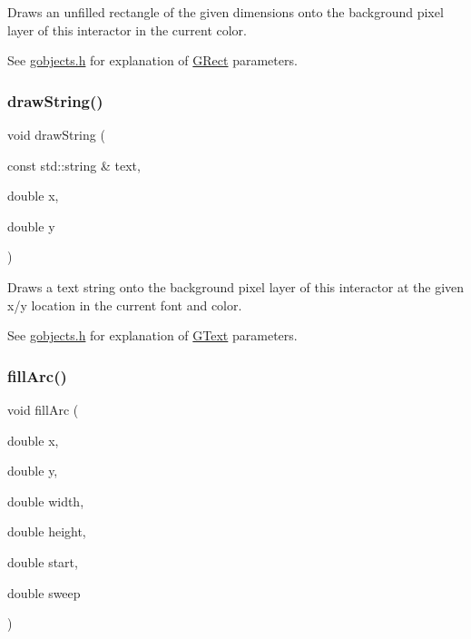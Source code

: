 Draws an unfilled rectangle of the given dimensions onto the background pixel layer of this interactor in the current color. 

See \mbox{\hyperlink{gobjects_8h_source}{gobjects.\+h}} for explanation of \mbox{\hyperlink{classGRect}{G\+Rect}} parameters. \mbox{\label{classGDrawingSurface_ad4e8551a753a77135792bbee97013675}} 
\subsubsection{\texorpdfstring{draw\+String()}{drawString()}}
{\footnotesize\ttfamily void draw\+String (\begin{DoxyParamCaption}\item[{const std\+::string \&}]{text,  }\item[{double}]{x,  }\item[{double}]{y }\end{DoxyParamCaption})\hspace{0.3cm}{\ttfamily [virtual]}}



Draws a text string onto the background pixel layer of this interactor at the given x/y location in the current font and color. 

See \mbox{\hyperlink{gobjects_8h_source}{gobjects.\+h}} for explanation of \mbox{\hyperlink{classGText}{G\+Text}} parameters. \mbox{\label{classGDrawingSurface_a228075ad18bd97b57f9956568c4773f3}} 
\subsubsection{\texorpdfstring{fill\+Arc()}{fillArc()}}
{\footnotesize\ttfamily void fill\+Arc (\begin{DoxyParamCaption}\item[{double}]{x,  }\item[{double}]{y,  }\item[{double}]{width,  }\item[{double}]{height,  }\item[{double}]{start,  }\item[{double}]{sweep }\end{DoxyParamCaption})\hspace{0.3cm}{\ttfamily [virtual]}}



